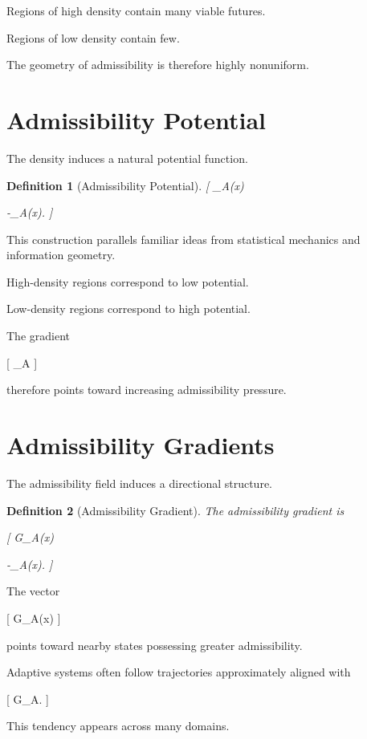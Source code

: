 \documentclass[11pt,oneside,openany]{book}
\newtheorem{definition}{Definition}[chapter] \newtheorem{theorem}{Theorem}[chapter] \newtheorem{proposition}{Proposition}[chapter] \newtheorem{lemma}{Lemma}[chapter] \newtheorem{corollary}{Corollary}[chapter] \newtheorem{remark}{Remark}[chapter]
\begin{document}
Regions of high density contain many viable futures.

Regions of low density contain few.

The geometry of admissibility is therefore highly nonuniform.

\section{Admissibility Potential}

The density induces a natural potential function.

\begin{definition}[Admissibility Potential]

[
\Phi_A(x)

-\log \rho_A(x).
]

\end{definition}

This construction parallels familiar ideas from statistical mechanics and information geometry.

High-density regions correspond to low potential.

Low-density regions correspond to high potential.

The gradient

[
\nabla\Phi_A
]

therefore points toward increasing admissibility pressure.

\section{Admissibility Gradients}

The admissibility field induces a directional structure.

\begin{definition}[Admissibility Gradient]

The admissibility gradient is

[
G_A(x)

-\nabla\Phi_A(x).
]

\end{definition}

The vector

[
G_A(x)
]

points toward nearby states possessing greater admissibility.

Adaptive systems often follow trajectories approximately aligned with

[
G_A.
]

This tendency appears across many domains.
\end{document}
